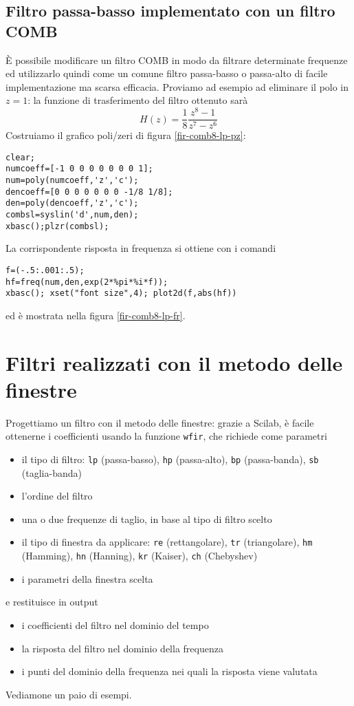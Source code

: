 \subsection*{Filtro passa-basso implementato con un filtro COMB}
\`E possibile modificare un filtro COMB in modo da filtrare determinate frequenze ed utilizzarlo quindi come un comune filtro passa-basso o passa-alto di facile implementazione ma scarsa efficacia.
Proviamo ad esempio ad eliminare il polo in $z=1$: la funzione di trasferimento del filtro ottenuto sar\`a
\begin{displaymath}
H(z)=\frac{1}{8} \frac{z^8 -1}{z^7 -z^6}
\end{displaymath}
Costruiamo il grafico poli/zeri di figura \ref{fir-comb8-lp-pz}:
\begin{verbatim}
clear;
numcoeff=[-1 0 0 0 0 0 0 0 1];
num=poly(numcoeff,'z','c');
dencoeff=[0 0 0 0 0 0 0 -1/8 1/8];
den=poly(dencoeff,'z','c');
combsl=syslin('d',num,den);
xbasc();plzr(combsl);
\end{verbatim}


La corrispondente risposta in frequenza si ottiene con i comandi 
\begin{verbatim}
f=(-.5:.001:.5);
hf=freq(num,den,exp(2*%pi*%i*f));
xbasc(); xset("font size",4); plot2d(f,abs(hf))
\end{verbatim}
ed \`e mostrata nella figura \ref{fir-comb8-lp-fr}.


\section{Filtri realizzati con il metodo delle finestre}
Progettiamo un filtro con il metodo delle finestre: grazie a Scilab, \`e facile ottenerne i coefficienti usando la funzione \verb+wfir+, che richiede come parametri
\begin{itemize}
\item il tipo di filtro: \verb+lp+ (passa-basso), \verb+hp+ (passa-alto), \verb+bp+ (passa-banda), \verb+sb+ (taglia-banda)
\item l'ordine del filtro
\item una o due frequenze di taglio, in base al tipo di filtro scelto
\item il tipo di finestra da applicare: \verb+re+ (rettangolare), \verb+tr+ (triangolare), \verb+hm+ (Hamming), \verb+hn+ (Hanning), \verb+kr+ (Kaiser), \verb+ch+ (Chebyshev)
\item i parametri della finestra scelta  
\end{itemize}
e restituisce in output
\begin{itemize}
\item i coefficienti del filtro nel dominio del tempo
\item la risposta del filtro nel dominio della frequenza
\item i punti del dominio della frequenza nei quali la risposta viene valutata
\end{itemize}
Vediamone un paio di esempi.

